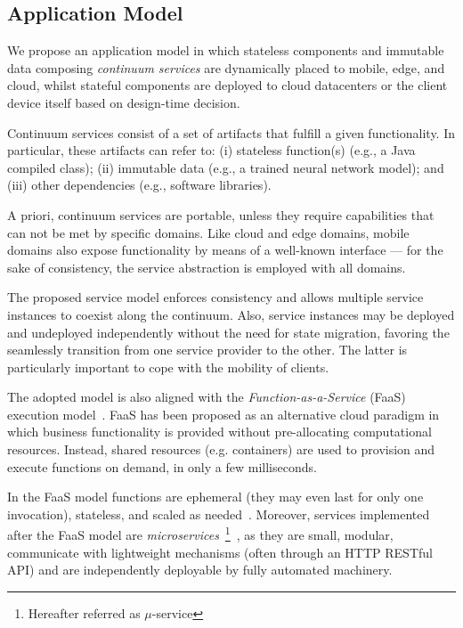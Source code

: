 


\subsection{Application Model}\label{sec:application_model}

We propose an application model in which stateless components and immutable data composing \textit{continuum services} are dynamically placed to mobile, edge, and cloud,
whilst 
stateful components are deployed to cloud datacenters or the client device itself based on design-time decision.

Continuum services consist of a set of artifacts that fulfill a given functionality. In particular, these artifacts can refer to: (i) stateless function(s) (e.g., a Java compiled class); (ii) immutable data (e.g., a trained neural network model); and (iii) other dependencies (e.g., software libraries).

A priori, continuum services are portable, unless they require capabilities that can not be met by specific domains. Like cloud and edge domains, mobile domains also expose functionality by means of a well-known interface --- for the sake of consistency, the service abstraction is employed with all domains.

The proposed service model enforces consistency and allows multiple service instances to coexist along the continuum. Also, service instances may be deployed and undeployed independently without the need for state migration, favoring the seamlessly transition from one service provider to the other. The latter is particularly important to cope with the mobility of clients.

The adopted model is also aligned with the \textit{Function-as-a-Service} (FaaS) execution model~\cite{MateosFaaster17}. FaaS has been proposed as an alternative cloud paradigm in which business functionality is provided without pre-allocating computational resources. Instead, shared resources (e.g. containers) are used to provision and execute functions on demand, in only a few milliseconds. 

In the FaaS model functions are ephemeral (they may even last for only one invocation), stateless, and scaled as needed~\cite{Roberts:2016}. Moreover, services implemented after the FaaS model are \textit{microservices}~\footnote{Hereafter referred as $\mu$-service}~\cite{lewis2014microservices}, as they are small, modular, communicate with lightweight mechanisms (often through an HTTP RESTful API) and are independently deployable by fully automated machinery. %

